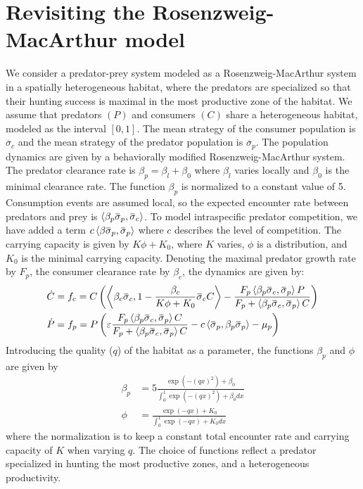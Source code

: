 \section{Revisiting the Rosenzweig-MacArthur model}
\label{sec:model_rm}
We consider a predator-prey system modeled as a Rosenzweig-MacArthur system in a spatially heterogeneous habitat, where the predators are specialized so that their hunting success is maximal in the most productive zone of the habitat.
We assume that predators $(P)$ and consumers $(C)$ share a heterogeneous habitat, modeled as the interval $[0,1]$. The mean strategy of the consumer population is $\overbar{\sigma}_c$ and the mean strategy of the predator population is $\overbar{\sigma}_p$.
The population dynamics are given by a behaviorally modified Rosenzweig-MacArthur system. The predator clearance rate is $\beta_p = \beta_{l} + \beta_0$ where $\beta_l$ varies locally and $\beta_0$ is the minimal clearance rate. The function $\beta_p$ is normalized to a constant value of 5.
Consumption events are assumed local, so the expected encounter rate between predators and prey is $\ip{\beta_p \overbar{\sigma}_p}{\overbar{\sigma}_c}$. To model intraspecific predator competition, we have added a term $c\ip{\beta \overbar{\sigma}_p}{\overbar{\sigma}_p}$ where $c$ describes the level of competition. The carrying capacity is given by $K\phi + K_0$,
 where $K$ varies, $\phi$ is a distribution, and $K_0$ is the minimal carrying capacity. Denoting the maximal predator growth rate by $F_p$, the consumer clearance rate by $\beta_c$, the dynamics are given by:
\begin{align}
  \dot{C} &= f_c = C \pa{\ip{\beta_c \overbar{\sigma}_c}{1-\frac{\beta_c}{K\phi + K_0}\overbar{\sigma}_c C} - \frac{F_p \ip{\beta_p \overbar{\sigma}_c}{\overbar{\sigma}_p} P}{F_p + \ip{\beta_p \overbar{\sigma}_c}{\overbar{\sigma}_p} C} } \\
  \dot{P} &= f_p = P \pa{\epsilon \frac{F_p \ip{\beta_p \overbar{\sigma}_c}{\overbar{\sigma}_p} C}{F_p + \ip{\beta_p \overbar{\sigma}_c}{\overbar{\sigma}_p} C} - c \ip{\overbar{\sigma}_p}{\beta_p \overbar{\sigma}_p}  - \mu_p}
  \label{eq:dynamics}
\end{align}
Introducing the quality ($q$) of the habitat as a parameter, the functions $\beta_p$ and $\phi$ are given by
\begin{align}
  \beta_p &= 5 \frac{\exp(-(q x)^2) + \beta_0}{\int_0^1 \exp(-(q x)^2) + \beta_0 dx} \\
  \phi &= \frac{\exp(-q x) + K_0}{\int_0^1 \exp(-q x) + K_0 dx}
\end{align}
where the normalization is to keep a constant total encounter rate and carrying capacity of $K$ when varying $q$. The choice of functions reflect a predator specialized in hunting the most productive zones, and a heterogeneous productivity.

